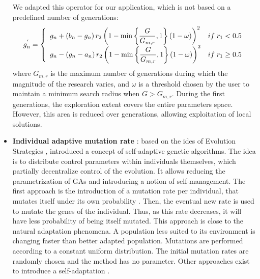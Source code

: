 \documentclass[twocol]{ametsoc}
\begin{document}
\begin{itemize}
	We adapted this operator for our application, which is not based on a predefined number of generations:
	\begin{equation}
	g_{n}^{'} = 
	\left\lbrace \begin{array}{l l} 
	g_{n} + \left(b_{n}-g_{n}\right) r_{2} \left(1 - \min \left\lbrace \dfrac{G}{G_{m,r}}, 1 \right\rbrace \left(1-\omega\right) \right)^{2} & if \; r_{1} < 0.5 \\
	g_{n} - \left(g_{n}-a_{n}\right) r_{2} \left(1 - \min \left\lbrace \dfrac{G}{G_{m,r}}, 1 \right\rbrace \left(1-\omega\right) \right)^{2} & if \; r_{1} \geq 0.5 \\
	\end{array} \right.
	\label{equation_mutation_nonuniform}
	\end{equation}
	where $G_{m,r}$ is the maximum number of generations during which the magnitude of the research varies, and $\omega$ is a threshold chosen by the user to maintain a minimum search radius when $G>G_{m,r}$. During the first generations, the exploration extent covers the entire parameters space. However, this area is reduced over generations, allowing exploitation of local solutions.
	
	\item \textbf{Individual adaptive mutation rate} \citep{Back1992a}: based on the ides of Evolution Strategies \citep[see][]{Rechenberg1973, Schwefel1981}, \citet{Back1992a} introduced a concept of self-adaptive genetic algorithms. The idea is to distribute control parameters within individuals themselves, which partially decentralize control of the evolution. It allows reducing the parametrization of GAs and introducing a notion of self-management. The first approach is the introduction of a mutation rate per individual, that mutates itself under its own probability \citep{Back1992a}. Then, the eventual new rate is used to mutate the genes of the individual. Thus, as this rate decreases, it will have less probability of being itself mutated. This approach is close to the natural adaptation phenomena. A population less suited to its environment is changing faster than better adapted population. Mutations are performed according to a constant uniform distribution. The initial mutation rates are randomly chosen \citep{Back1992a} and the method has no parameter. Other approaches exist to introduce a self-adaptation \citep[see][]{Smith1997a,Deb1999,Deb2001a}.
	

\end{itemize}
\end{document}
